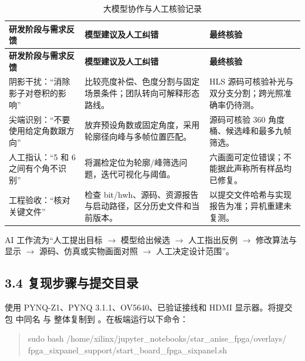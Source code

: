 \documentclass[UTF8,fontset=windows,a4paper,11pt]{ctexart}
\begin{document}
\begin{center}
\begingroup
\fontsize{8.5}{11}\selectfont
\setlength{\tabcolsep}{3pt}
\renewcommand{\arraystretch}{1.22}
\begin{longtable}{@{}p{3.781cm}p{5.104cm}p{4.915cm}@{}}
\caption{大模型协作与人工核验记录}\\
\toprule
\textbf{研发阶段与需求反馈} & \textbf{模型建议及人工纠错} & \textbf{最终核验} \\
\midrule
\endfirsthead
\toprule
\textbf{研发阶段与需求反馈} & \textbf{模型建议及人工纠错} & \textbf{最终核验} \\
\midrule
\endhead
\bottomrule
\endfoot
阴影干扰：“消除影子对卷积的影响” & 比较亮度补偿、色度分割与固定场景条件；团队转向可解释形态路线。 & HLS 源码可核验补光与双分支分割；跨光照准确率仍待测。 \\
尖端识别：“不要使用给定角数跟方向” & 放弃预设角数或固定角度，采用轮廓径向峰与多帧位置匹配。 & 源码可核验 360 角度桶、候选峰和最多九帧筛选。 \\
人工指认：“5 和 6 之间有个角不识别” & 将漏检定位为轮廓/峰筛选问题，迭代可视化与阈值。 & 六画面可定位错误；不能据此声称所有样品均已修复。 \\
工程验收：“核对关键文件” & 检查 bit/hwh、源码、资源报告与启动路径，区分历史文件和当前版本。 & 以提交文件哈希与实现报告为准；异机重建未复测。 \\
\end{longtable}
\endgroup
\end{center}

AI 工作流为“人工提出目标 $\rightarrow$ 模型给出候选 $\rightarrow$ 人工指出反例 $\rightarrow$ 修改算法与显示 $\rightarrow$ 源码、仿真或实物画面对照 $\rightarrow$ 人工决定设计范围”。\par

\subsection*{3.4 复现步骤与提交目录}

使用 PYNQ-Z1、PYNQ 3.1.1、OV5640、已验证接线和 HDMI 显示器。将提交包  中同名  与  整体复制到 。在板端运行以下命令：\par

\begin{quote}\small\ttfamily sudo bash /home/xilinx/jupyter\_notebooks/star\_anise\_fpga/overlays/\\fpga\_sixpanel\_support/start\_board\_fpga\_sixpanel.sh\end{quote}
\end{document}
